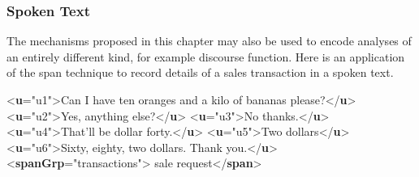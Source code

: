 \subsubsection[{Spoken Text}]{Spoken Text}\label{AILASP}\par
The mechanisms proposed in this chapter may also be used to encode analyses of an entirely different kind, for example discourse function. Here is an application of the span technique to record details of a sales transaction in a spoken text. \par\bgroup{}\exampleFont \begin{shaded}\noindent\mbox{}{<\textbf{u}\hspace*{1em}{xml:id}="{u1}">}Can I have ten oranges and a kilo of bananas please?{</\textbf{u}>}\mbox{}\newline 
{<\textbf{u}\hspace*{1em}{xml:id}="{u2}">}Yes, anything else?{</\textbf{u}>}\mbox{}\newline 
{<\textbf{u}\hspace*{1em}{xml:id}="{u3}">}No thanks.{</\textbf{u}>}\mbox{}\newline 
{<\textbf{u}\hspace*{1em}{xml:id}="{u4}">}That'll be dollar forty.{</\textbf{u}>}\mbox{}\newline 
{<\textbf{u}\hspace*{1em}{xml:id}="{u5}">}Two dollars{</\textbf{u}>}\mbox{}\newline 
{<\textbf{u}\hspace*{1em}{xml:id}="{u6}">}Sixty, eighty, two dollars. Thank you.{</\textbf{u}>}\mbox{}\newline 
{<\textbf{spanGrp}\hspace*{1em}{type}="{transactions}">}\mbox{}\newline 
{}sale request{</\textbf{span}>}\mbox{}\newline 

\end{shaded}
